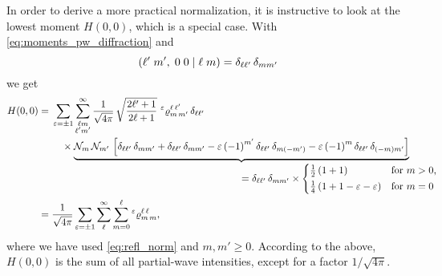 In order to derive a more practical normalization, it is instructive
to look at the lowest moment $H(0, 0)$, which is a special case.  With
\cref{eq:moments_pw_diffraction} and
\begin{equation}
  ({\ell'}\;{m'},\;{0}\;{0}\; |\; {\ell}\;{m})
  = \delta_{\ell \ell'}\, \delta_{m m'}
\end{equation}
we get
\begin{align}
  H(0, 0)
  ={}& \begin{multlined}[t]
    \sum_{\refl = \pm 1} \sum_{\substack{\ell m \\ \ell' m'}}^\infty
    \frac{1}{\sqrt{4 \pi}}\, \sqrt{\frac{2 \ell' + 1}{2 \ell + 1}}\,
      \prescript{\refl}{}{\varrho}^{\ell\, \ell'}_{m\, m'}\, \delta_{\ell \ell'} \\
      \times \rdUnderbrace{\mathcal{N}_m\, \mathcal{N}_{m'}\, \sBrk[2]{%
        \delta_{\ell \ell'}\, \delta_{m m'}
        + \delta_{\ell \ell'}\, \delta_{m m'}
        - \refl\, {(-1)}^{m'}\, \delta_{\ell \ell'}\, \delta_{m (-m')}
        - \refl\, {(-1)}^m\, \delta_{\ell \ell'}\, \delta_{(-m) m'}}}%
        {= \delta_{\ell \ell'}\, \delta_{m m'} \times
        \begin{cases*}
          \frac{1}{2}\, (1 + 1)                 & for $m > 0$, \\
          \frac{1}{4}\, (1 + 1 - \refl - \refl) & for $m = 0$
        \end{cases*}}
  \end{multlined} \notag
  \\
  \label{eq:moment_00_pw_diffraction}
  ={}& \frac{1}{\sqrt{4 \pi}} \sum_{\refl = \pm 1} \sum_\ell^\infty \sum_{m = 0}^\ell \prescript{\refl}{}{\varrho}^{\ell\, \ell}_{m\, m},
\end{align}
where we have used \cref{eq:refl_norm} and $m, m' \geq 0$.  According
to the above, $H(0, 0)$ is the sum of all partial-wave
intensities, except for a factor $1 / \sqrt{4 \pi}$.

